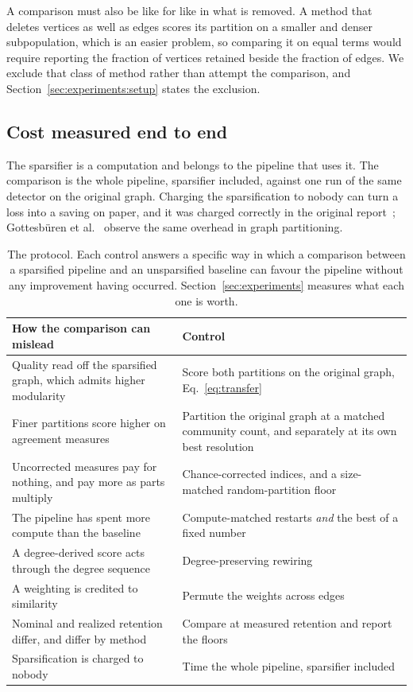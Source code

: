 A comparison must also be like for like in what is removed. A method that deletes
vertices as well as edges scores its partition on a smaller and denser
subpopulation, which is an easier problem, so comparing it on equal terms would
require reporting the fraction of vertices retained beside the fraction of edges.
We exclude that class of method rather than attempt the comparison, and
Section~\ref{sec:experiments:setup} states the exclusion.

\subsection{Cost measured end to end}\label{sec:protocol:cost}

The sparsifier is a computation and belongs to the pipeline that uses it. The
comparison is the whole pipeline, sparsifier included, against one run of the same
detector on the original graph. Charging the sparsification to nobody can turn a
loss into a saving on paper, and it was charged correctly in the original
report~\cite{satuluri2011local}; Gottesb\"{u}ren et
al.~\cite{gottesburen2025linear} observe the same overhead in graph partitioning.

\begin{table}[t]
\centering
\caption{The protocol. Each control answers a specific way in which a comparison
between a sparsified pipeline and an unsparsified baseline can favour the
pipeline without any improvement having occurred. Section~\ref{sec:experiments}
measures what each one is worth.}
\label{tab:protocol}
\small
\setlength{\tabcolsep}{4pt}
\begin{tabular}{@{}p{}p{}@{}}
\toprule
How the comparison can mislead & Control\\
\midrule
Quality read off the sparsified graph, which admits higher modularity &
Score both partitions on the original graph, Eq.~\eqref{eq:transfer}\\
Finer partitions score higher on agreement measures &
Partition the original graph at a matched community count, and separately at its
own best resolution\\
Uncorrected measures pay for nothing, and pay more as parts multiply &
Chance-corrected indices, and a size-matched random-partition floor\\
The pipeline has spent more compute than the baseline &
Compute-matched restarts \emph{and} the best of a fixed number\\
A degree-derived score acts through the degree sequence &
Degree-preserving rewiring\\
A weighting is credited to similarity &
Permute the weights across edges\\
Nominal and realized retention differ, and differ by method &
Compare at measured retention and report the floors\\
Sparsification is charged to nobody &
Time the whole pipeline, sparsifier included\\
\bottomrule
\end{tabular}
\end{table}
